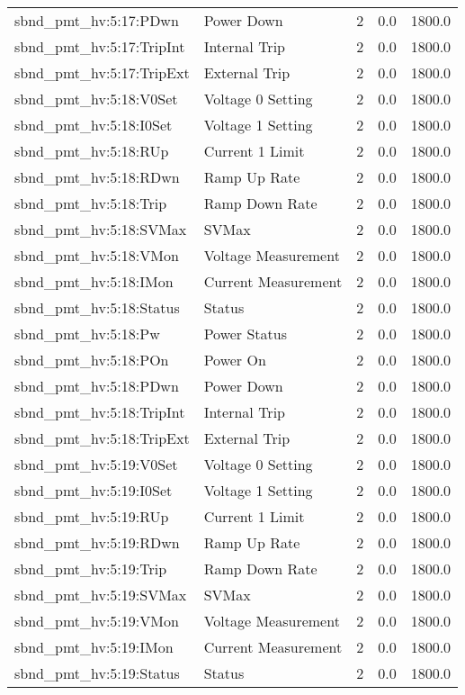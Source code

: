 \begin{center}
\begin{longtable}{l | l l l l }
sbnd\_pmt\_hv:5:17:PDwn & Power Down & 2 & 0.0 & 1800.0\\ 
sbnd\_pmt\_hv:5:17:TripInt & Internal Trip & 2 & 0.0 & 1800.0\\ 
sbnd\_pmt\_hv:5:17:TripExt & External Trip & 2 & 0.0 & 1800.0\\ 
sbnd\_pmt\_hv:5:18:V0Set & Voltage 0 Setting & 2 & 0.0 & 1800.0\\ 
sbnd\_pmt\_hv:5:18:I0Set & Voltage 1 Setting & 2 & 0.0 & 1800.0\\ 
sbnd\_pmt\_hv:5:18:RUp & Current 1 Limit & 2 & 0.0 & 1800.0\\ 
sbnd\_pmt\_hv:5:18:RDwn & Ramp Up Rate & 2 & 0.0 & 1800.0\\ 
sbnd\_pmt\_hv:5:18:Trip & Ramp Down Rate & 2 & 0.0 & 1800.0\\ 
sbnd\_pmt\_hv:5:18:SVMax & SVMax & 2 & 0.0 & 1800.0\\ 
sbnd\_pmt\_hv:5:18:VMon & Voltage Measurement & 2 & 0.0 & 1800.0\\ 
sbnd\_pmt\_hv:5:18:IMon & Current Measurement & 2 & 0.0 & 1800.0\\ 
sbnd\_pmt\_hv:5:18:Status & Status & 2 & 0.0 & 1800.0\\ 
sbnd\_pmt\_hv:5:18:Pw & Power Status & 2 & 0.0 & 1800.0\\ 
sbnd\_pmt\_hv:5:18:POn & Power On & 2 & 0.0 & 1800.0\\ 
sbnd\_pmt\_hv:5:18:PDwn & Power Down & 2 & 0.0 & 1800.0\\ 
sbnd\_pmt\_hv:5:18:TripInt & Internal Trip & 2 & 0.0 & 1800.0\\ 
sbnd\_pmt\_hv:5:18:TripExt & External Trip & 2 & 0.0 & 1800.0\\ 
sbnd\_pmt\_hv:5:19:V0Set & Voltage 0 Setting & 2 & 0.0 & 1800.0\\ 
sbnd\_pmt\_hv:5:19:I0Set & Voltage 1 Setting & 2 & 0.0 & 1800.0\\ 
sbnd\_pmt\_hv:5:19:RUp & Current 1 Limit & 2 & 0.0 & 1800.0\\ 
sbnd\_pmt\_hv:5:19:RDwn & Ramp Up Rate & 2 & 0.0 & 1800.0\\ 
sbnd\_pmt\_hv:5:19:Trip & Ramp Down Rate & 2 & 0.0 & 1800.0\\ 
sbnd\_pmt\_hv:5:19:SVMax & SVMax & 2 & 0.0 & 1800.0\\ 
sbnd\_pmt\_hv:5:19:VMon & Voltage Measurement & 2 & 0.0 & 1800.0\\ 
sbnd\_pmt\_hv:5:19:IMon & Current Measurement & 2 & 0.0 & 1800.0\\ 
sbnd\_pmt\_hv:5:19:Status & Status & 2 & 0.0 & 1800.0\\ 

\end{longtable}
\end{center}
